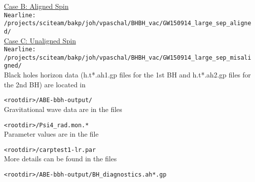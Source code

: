 \documentclass{article}
\begin{document}
\underline{Case B: Aligned Spin} \\
	\verb|Nearline: /projects/sciteam/bakp/joh/vpaschal/BHBH_vac/GW150914_large_sep_aligned/| \\

\underline{Case C: Unaligned Spin} \\
	\verb|Nearline: /projects/sciteam/bakp/joh/vpaschal/BHBH_vac/GW150914_large_sep_misaligned/| \\

Black holes horizon data (h.t*.ah1.gp files for the 1st BH and h.t*.ah2.gp files for the 2nd BH) are located in
	
	\verb|<rootdir>/ABE-bbh-output/| \\
Gravitational wave data are in the files

	\verb|<rootdir>/Psi4_rad.mon.*| \\
Parameter values are in the file

	\verb|<rootdir>/carptest1-lr.par| \\
More details can be found in the files
	
	\verb|<rootdir>/ABE-bbh-output/BH_diagnostics.ah*.gp|
\end{document}
